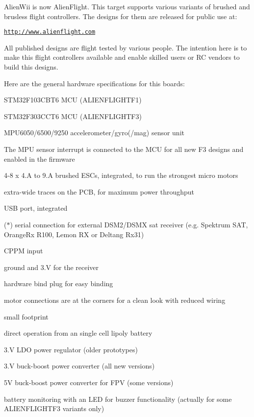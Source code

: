 Alien\+Wii is now Alien\+Flight. This target supports various variants of brushed and brusless flight controllers. The designs for them are released for public use at\+:

\href{http://www.alienflight.com}{\tt http\+://www.\+alienflight.\+com}

All published designs are flight tested by various people. The intention here is to make this flight controllers available and enable skilled users or R\+C vendors to build this designs.

Here are the general hardware specifications for this boards\+:


\begin{DoxyItemize}
\item S\+T\+M32\+F103\+C\+B\+T6 M\+C\+U (A\+L\+I\+E\+N\+F\+L\+I\+G\+H\+T\+F1)
\item S\+T\+M32\+F303\+C\+C\+T6 M\+C\+U (A\+L\+I\+E\+N\+F\+L\+I\+G\+H\+T\+F3)
\item M\+P\+U6050/6500/9250 accelerometer/gyro(/mag) sensor unit
\item The M\+P\+U sensor interrupt is connected to the M\+C\+U for all new F3 designs and enabled in the firmware
\item 4-\/8 x 4.\+A to 9.\+A brushed E\+S\+Cs, integrated, to run the strongest micro motors
\item extra-\/wide traces on the P\+C\+B, for maximum power throughput
\item U\+S\+B port, integrated
\item ($\ast$) serial connection for external D\+S\+M2/\+D\+S\+M\+X sat receiver (e.\+g. Spektrum S\+A\+T, Orange\+Rx R100, Lemon R\+X or Deltang Rx31)
\item C\+P\+P\+M input
\item ground and 3.\+V for the receiver
\item hardware bind plug for easy binding
\item motor connections are at the corners for a clean look with reduced wiring
\item small footprint
\item direct operation from an single cell lipoly battery
\item 3.\+V L\+D\+O power regulator (older prototypes)
\item 3.\+V buck-\/boost power converter (all new versions)
\item 5\+V buck-\/boost power converter for F\+P\+V (some versions)
\item battery monitoring with an L\+E\+D for buzzer functionality (actually for some A\+L\+I\+E\+N\+F\+L\+I\+G\+H\+T\+F3 variants only)
\end{DoxyItemize}

